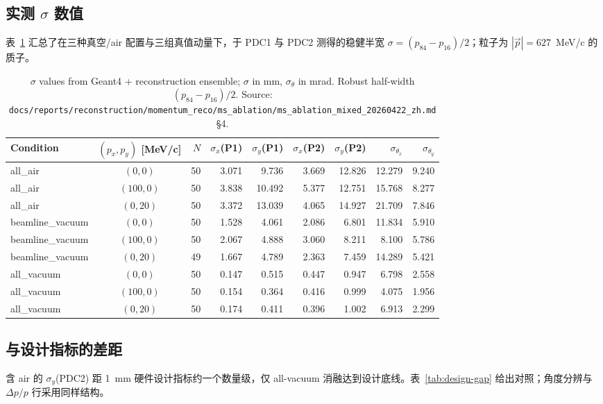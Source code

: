 \documentclass[a4paper, 11pt]{article}
\begin{document}
\subsection{实测 \texorpdfstring{$\sigma$}{sigma} 数值}
表~\ref{tab:sigma-three-conditions} 汇总了在三种真空/air 配置与三组真值动量下，于 PDC1 与 PDC2 测得的稳健半宽 $\sigma = (p_{84}-p_{16})/2$；粒子为 $|\vec p|=627$~MeV/c 的质子。

\begin{table}[H]
  \centering
  \small
  \begin{tabular}{lcrrrrrrr}
    \toprule
    Condition & $(p_x, p_y)$ [MeV/c] & $N$ & $\sigma_x$(P1) & $\sigma_y$(P1) & $\sigma_x$(P2) & $\sigma_y$(P2) & $\sigma_{\theta_x}$ & $\sigma_{\theta_y}$ \\
    \midrule
    all\_air         & $(0,0)$    & 50 & 3.071 & 9.736  & 3.669 & 12.826 & 12.279 & 9.240 \\
    all\_air         & $(100,0)$  & 50 & 3.838 & 10.492 & 5.377 & 12.751 & 15.768 & 8.277 \\
    all\_air         & $(0,20)$   & 50 & 3.372 & 13.039 & 4.065 & 14.927 & 21.709 & 7.846 \\
    \midrule
    beamline\_vacuum & $(0,0)$    & 50 & 1.528 & 4.061  & 2.086 & 6.801  & 11.834 & 5.910 \\
    beamline\_vacuum & $(100,0)$  & 50 & 2.067 & 4.888  & 3.060 & 8.211  & 8.100  & 5.786 \\
    beamline\_vacuum & $(0,20)$   & 49 & 1.667 & 4.789  & 2.363 & 7.459  & 14.289 & 5.421 \\
    \midrule
    all\_vacuum      & $(0,0)$    & 50 & 0.147 & 0.515  & 0.447 & 0.947  & 6.798  & 2.558 \\
    all\_vacuum      & $(100,0)$  & 50 & 0.154 & 0.364  & 0.416 & 0.999  & 4.075  & 1.956 \\
    all\_vacuum      & $(0,20)$   & 50 & 0.174 & 0.411  & 0.396 & 1.002  & 6.913  & 2.299 \\
    \bottomrule
  \end{tabular}
  \caption{$\sigma$ values from Geant4 + reconstruction ensemble; $\sigma$ in mm, $\sigma_\theta$ in mrad. Robust half-width $(p_{84}-p_{16})/2$. Source: \texttt{docs/reports/reconstruction/momentum\_reco/ms\_ablation/ms\_ablation\_mixed\_20260422\_zh.md} §4.}
  \label{tab:sigma-three-conditions}
\end{table}

\subsection{与设计指标的差距}
含 air 的 $\sigma_y$(PDC2) 距 1~mm 硬件设计指标约一个数量级，仅 all-vacuum 消融达到设计底线。表~\ref{tab:design-gap} 给出对照；角度分辨与 $\Delta p/p$ 行采用同样结构。
\end{document}
